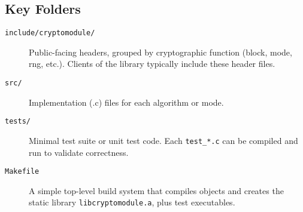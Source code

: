 \documentclass[12pt,a4paper]{article}
\begin{document}

\subsection{Key Folders}
\begin{description}
    \item[\texttt{include/cryptomodule/}] Public-facing headers, grouped by cryptographic function (block, mode, rng, etc.). Clients of the library typically include these header files.
    \item[\texttt{src/}] Implementation (.c) files for each algorithm or mode.
    \item[\texttt{tests/}] Minimal test suite or unit test code. Each \texttt{test\_*.c} can be compiled and run to validate correctness.
    \item[\texttt{Makefile}] A simple top-level build system that compiles objects and creates the static library \texttt{libcryptomodule.a}, plus test executables.
\end{description}
\end{document}
